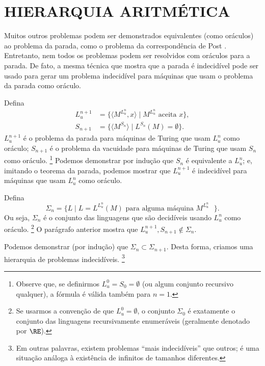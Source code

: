 \section{HIERARQUIA ARITMÉTICA}
\label{sec:arithmetical_hierarchy}

Muitos outros problemas podem ser demonstrados equivalentes
(como oráculos)
ao problema da parada,
como o problema da correspondência de Post \cite[p.~214]{HopcroftUllman1979}.
Entretanto,
nem todos os problemas podem ser resolvidos com oráculos para a parada.
De fato, a mesma técnica que mostra que a parada é indecidível
pode ser usado para gerar um problema indecidível
para máquinas que usam o problema da parada como oráculo.

Defina
\begin{align*}
    L_u^{n+1} &= \{ \langle M^{L_u^n}, x \rangle \mid M^{L_u^n} \text{ aceita } x \}, \\
    S_{n+1} &= \{ \langle M^{S_n} \rangle \mid L^{S_n}(M) = \emptyset \}.
\end{align*}
$L_u^{n+1}$ é o problema da parada
para máquinas de Turing que usam $L_u^n$ como oráculo;
$S_{n+1}$ é o problema da vacuidade
para máquinas de Turing que usam $S_n$ como oráculo.%
\footnote{
    Observe que,
    se definirmos $L_u^0 = S_0 = \emptyset$
    (ou algum conjunto recursivo qualquer),
    a fórmula é válida também para $n = 1$.
}
Podemos demonstrar por indução que $S_n$ é equivalente a $L_u^n$;
e, imitando o teorema da parada,
podemos mostrar que $L_u^{n+1}$ é indecidível para máquinas que usam $L_u^n$ como oráculo.

Defina
\begin{equation*}
    \Sigma_n = \{ L \mid L = L^{L_u^n}(M) \text{ para alguma máquina $M^{L_u^n}$ } \}.
\end{equation*}
Ou seja, $\Sigma_n$ é o conjunto das linguagens
que são decidíveis usando $L_u^n$ como oráculo.%
\footnote{
    Se usarmos a convenção de que $L_u^0 = \emptyset$,
    o conjunto $\Sigma_0$ é exatamente
    o conjunto das linguagens recursivamente enumeráveis
    (geralmente denotado por $\RE$).
}
O parágrafo anterior mostra que $L_u^{n+1}, S_{n+1} \notin \Sigma_n$.

Podemos demonstrar (por indução) que $\Sigma_n \subset \Sigma_{n+1}$.
Desta forma,
criamos uma hierarquia de problemas indecidíveis.%
\footnote{
    Em outras palavras,
    existem problemas ``mais indecidíveis'' que outros;
    é uma situação análoga à existência de infinitos de tamanhos diferentes.
}

